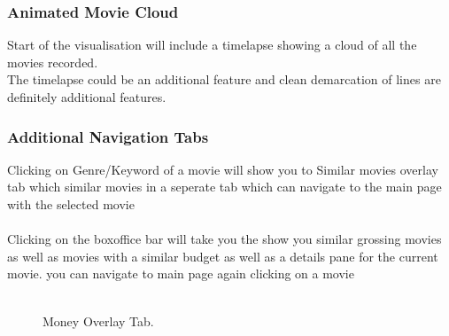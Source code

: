 \documentclass{report}
\begin{document}
\subsubsection{Animated Movie Cloud}
Start of the visualisation will include a timelapse showing a cloud of all the movies recorded.\\
The timelapse could be an additional feature and clean demarcation of lines are definitely additional features.
\subsubsection{Additional Navigation Tabs}
Clicking on Genre/Keyword of a movie will show you to Similar movies overlay tab which similar movies in a seperate tab which can navigate to the main page with the selected movie\\\\
Clicking on the boxoffice bar will take you the show you similar grossing movies as well as movies with a similar budget as well as a details pane for the current movie. you can navigate to main page again clicking on a movie\\\\
\begin{figure}[H]
	\caption{Money Overlay Tab.}
	\label{Fig:3}
\end{figure}
\end{document}
